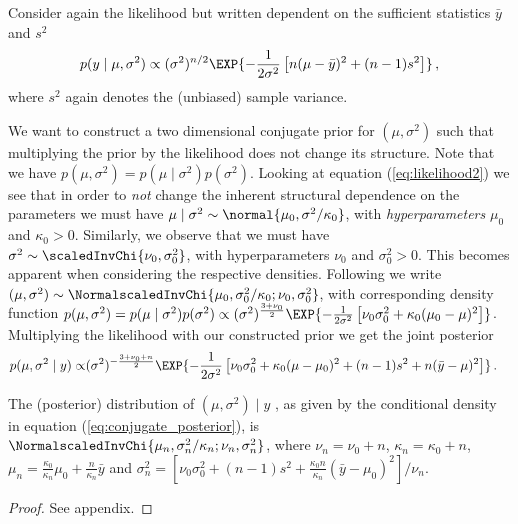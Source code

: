 Consider again the likelihood but written dependent on the sufficient statistics $\bar{y}$ and $s^2$
\begin{align}
  p(y \mid \mu, \sigma^2) \propto (\sigma^2)^{n/2} \EXP{-\frac{1}{2\sigma^2} \left[ n(\mu - \bar{y})^2 + (n-1)s^2 \right]} \,,
  \label{eq:likelihood2}
\end{align}
where $s^2$ again denotes the (unbiased) sample variance.

We want to construct a two dimensional conjugate prior for $(\mu, \sigma^2)$ such that multiplying the prior by the likelihood does not change its structure.
Note that we have $p(\mu, \sigma^2) = p(\mu \mid \sigma^2) p(\sigma^2)$.
Looking at equation (\ref{eq:likelihood2}) we see that in order to \emph{not} change the inherent structural dependence on the parameters we must have $\mu \mid \sigma^2 \sim \normal{\mu_0, \sigma^2 / \kappa_0}$, with \emph{hyperparameters} $\mu_0$ and $\kappa_0 > 0$.
Similarly, we observe that we must have $\sigma^2 \sim \scaledInvChi{\nu_0, \sigma_0^2}$, with hyperparameters $\nu_0$ and $\sigma_0^2 > 0$.
This becomes apparent when considering the respective densities.
Following \citet{gelmanbda04} we write $(\mu, \sigma^2) \sim \NormalscaledInvChi{\mu_0, \sigma_0^2 / \kappa_0; \nu_0, \sigma_0^2}$, with corresponding density function $p(\mu, \sigma^2) = p(\mu \mid \sigma^2) p(\sigma^2) \propto (\sigma^2)^{\frac{3 + \nu_0}{2}} \EXP{-\frac{1}{2\sigma^2} \left[\nu_0 \sigma_0^2 + \kappa_0(\mu_0 - \mu)^2 \right]}$.
Multiplying the likelihood with our constructed prior we get the joint posterior
\begin{align}
  p(\mu, \sigma^2 \mid y) \propto& (\sigma^2)^{-\frac{3 + \nu_0 + n}{2}} \EXP{-\frac{1}{2 \sigma^2} \left[\nu_0\sigma_0^2 + \kappa_0(\mu - \mu_0)^2 + (n-1)s^2 + n(\bar{y} - \mu)^2 \right]} \,.
  \label{eq:conjugate_posterior}
\end{align}

\begin{proposition}
  The (posterior) distribution of $(\mu, \sigma^2) \mid y$ , as given by the conditional density in equation (\ref{eq:conjugate_posterior}), is $\NormalscaledInvChi{\mu_n, \sigma_n^2/\kappa_n; \nu_n, \sigma_n^2}$, where
    $\nu_n = \nu_0 + n$, $\kappa_n = \kappa_0 + n$, $\mu_n =\frac{\kappa_0}{\kappa_n}\mu_0 + \frac{n}{\kappa_n}\bar{y}$ and $\sigma_n^2 = \left[\nu_0 \sigma_0^2 + (n-1)s^2 + \frac{\kappa_0 n}{\kappa_n} (\bar{y} - \mu_0)^2\right] /\nu_n$.
  \label{prop:posterior_conjugate}
\end{proposition}
\begin{proof}
  See appendix.
\end{proof}

